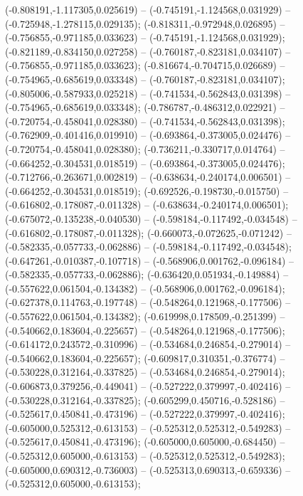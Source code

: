  (-0.808191,-1.117305,0.025619) -- (-0.745191,-1.124568,0.031929) -- (-0.725948,-1.278115,0.029135);
 (-0.818311,-0.972948,0.026895) -- (-0.756855,-0.971185,0.033623) -- (-0.745191,-1.124568,0.031929);
 (-0.821189,-0.834150,0.027258) -- (-0.760187,-0.823181,0.034107) -- (-0.756855,-0.971185,0.033623);
 (-0.816674,-0.704715,0.026689) -- (-0.754965,-0.685619,0.033348) -- (-0.760187,-0.823181,0.034107);
 (-0.805006,-0.587933,0.025218) -- (-0.741534,-0.562843,0.031398) -- (-0.754965,-0.685619,0.033348);
 (-0.786787,-0.486312,0.022921) -- (-0.720754,-0.458041,0.028380) -- (-0.741534,-0.562843,0.031398);
 (-0.762909,-0.401416,0.019910) -- (-0.693864,-0.373005,0.024476) -- (-0.720754,-0.458041,0.028380);
 (-0.736211,-0.330717,0.014764) -- (-0.664252,-0.304531,0.018519) -- (-0.693864,-0.373005,0.024476);
 (-0.712766,-0.263671,0.002819) -- (-0.638634,-0.240174,0.006501) -- (-0.664252,-0.304531,0.018519);
 (-0.692526,-0.198730,-0.015750) -- (-0.616802,-0.178087,-0.011328) -- (-0.638634,-0.240174,0.006501);
 (-0.675072,-0.135238,-0.040530) -- (-0.598184,-0.117492,-0.034548) -- (-0.616802,-0.178087,-0.011328);
 (-0.660073,-0.072625,-0.071242) -- (-0.582335,-0.057733,-0.062886) -- (-0.598184,-0.117492,-0.034548);
 (-0.647261,-0.010387,-0.107718) -- (-0.568906,0.001762,-0.096184) -- (-0.582335,-0.057733,-0.062886);
 (-0.636420,0.051934,-0.149884) -- (-0.557622,0.061504,-0.134382) -- (-0.568906,0.001762,-0.096184);
 (-0.627378,0.114763,-0.197748) -- (-0.548264,0.121968,-0.177506) -- (-0.557622,0.061504,-0.134382);
 (-0.619998,0.178509,-0.251399) -- (-0.540662,0.183604,-0.225657) -- (-0.548264,0.121968,-0.177506);
 (-0.614172,0.243572,-0.310996) -- (-0.534684,0.246854,-0.279014) -- (-0.540662,0.183604,-0.225657);
 (-0.609817,0.310351,-0.376774) -- (-0.530228,0.312164,-0.337825) -- (-0.534684,0.246854,-0.279014);
 (-0.606873,0.379256,-0.449041) -- (-0.527222,0.379997,-0.402416) -- (-0.530228,0.312164,-0.337825);
 (-0.605299,0.450716,-0.528186) -- (-0.525617,0.450841,-0.473196) -- (-0.527222,0.379997,-0.402416);
 (-0.605000,0.525312,-0.613153) -- (-0.525312,0.525312,-0.549283) -- (-0.525617,0.450841,-0.473196);
 (-0.605000,0.605000,-0.684450) -- (-0.525312,0.605000,-0.613153) -- (-0.525312,0.525312,-0.549283);
 (-0.605000,0.690312,-0.736003) -- (-0.525313,0.690313,-0.659336) -- (-0.525312,0.605000,-0.613153);
